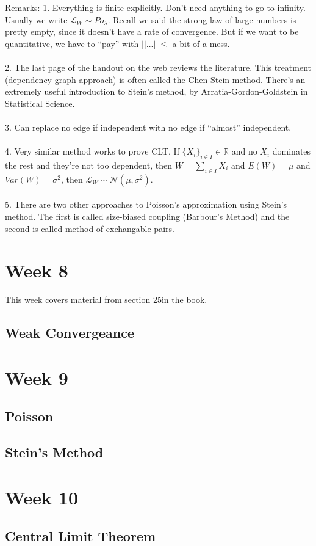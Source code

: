 \documentclass[12pt]{article}
\begin{document}
Remarks:  1.  Everything is finite explicitly.  Don't need anything to go to infinity.  Usually we write $ \mathcal{L}_W \sim Po_\lambda$.  Recall we said the strong law of large numbers is pretty empty, since it doesn't have a rate of convergence.  But if we want to be quantitative, we have to ``pay'' with $|| ... || \le $ a bit of a mess.
\\ \\
2.  The last page of the handout on the web reviews the literature.  This treatment (dependency graph approach) is often called the Chen-Stein method.  There's an extremely useful introduction to Stein's method, by Arratia-Gordon-Goldstein in Statistical Science.
\\ \\
3.  Can replace no edge if independent with no edge if ``almost'' independent.
\\ \\
4.  Very similar method works to prove CLT.  If $\{X_i\}_{i \in I} \in \mathbb{R}$ and no $X_i$ dominates the rest and they're not too dependent, then $W = \sum_{i \in I} X_i$ and $E(W) = \mu$ and $Var(W) = \sigma^2$, then $\mathcal{L}_W \sim \mathcal{N}(\mu, \sigma^2)$.
\\ \\
5.  There are two other approaches to Poisson's approximation using Stein's method.  The first is called size-biased coupling (Barbour's Method) and the second is called method of exchangable pairs.


\section{Week 8}
This week covers material from section 25in the book.

\subsection{Weak Convergeance}


\section{Week 9}

\subsection{Poisson}

\subsection{Stein's Method}


\section{Week 10}

\subsection{Central Limit Theorem}


\newpage
\begin{thebibliography}{99}

\end{thebibliography}
\end{document}
